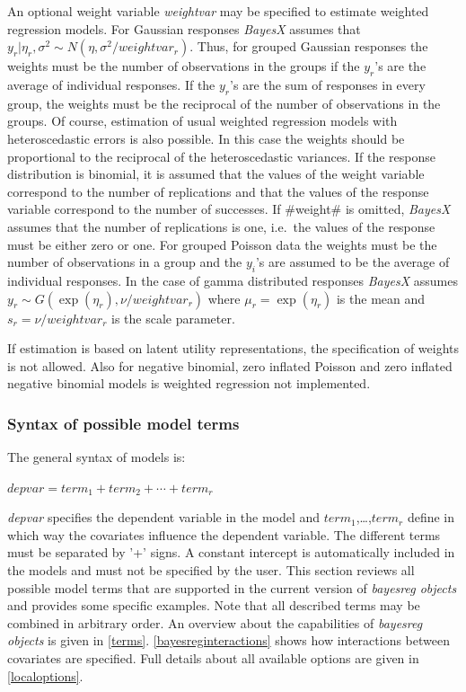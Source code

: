 An optional weight variable {\em weightvar} may be specified to
estimate weighted regression models. For Gaussian responses {\em
BayesX} assumes that $y_r|\eta_r,\sigma^2 \sim
N(\eta,\sigma^2/weightvar_r)$. Thus, for grouped Gaussian
responses the weights must be the number of observations in the
groups if the $y_r$'s are the average of individual responses. If
the $y_r$'s are the sum of responses in every group, the weights
must be the reciprocal of the number of observations in the
groups. Of course, estimation of usual weighted regression models
with heteroscedastic errors  is also possible. In this case the
weights should be proportional to the reciprocal of the
heteroscedastic variances. If the response distribution is
binomial, it is assumed that the values of the weight variable
correspond to the number of replications and that the values of
the response variable correspond to the number of successes. If
#weight# is omitted, {\em BayesX} assumes that the number of
replications is one, i.e.~the values of the response must be
either zero or one. For grouped Poisson data the weights must be
the number of observations in a group and the $y_i$'s are assumed
to be the average of individual responses. In the case of gamma
distributed responses {\em BayesX} assumes $y_r \sim
G(\exp(\eta_r),\nu/weightvar_r)$ where $\mu_r= \exp(\eta_r)$ is
the mean and $s_r = \nu/weightvar_r$ is the scale parameter.

If estimation is based on latent utility representations, the
specification of weights is not allowed. Also for negative
binomial, zero inflated Poisson and zero inflated negative
binomial models is weighted regression not implemented.

\subsubsection{Syntax of possible model terms}
\label{modelsyntax}

The general syntax of models is:

$depvar = term_1 + term_2 + \cdots + term_r$

{\em depvar} specifies the dependent variable in the model and
$term_1$,\dots,$term_r$ define in which way the covariates
influence the dependent variable. The different terms must be
separated by '+' signs. A constant intercept is automatically
included in the models and must not be specified by the user. This
section reviews all possible model terms that are supported in the
current version of {\em bayesreg objects} and provides some
specific examples. Note that all described terms may be combined
in arbitrary order. An overview about the capabilities of {\em
bayesreg objects} is given in \autoref{terms}.
\autoref{bayesreginteractions} shows how interactions between
covariates are specified. Full details about all available options
are given in \autoref{localoptions}.

